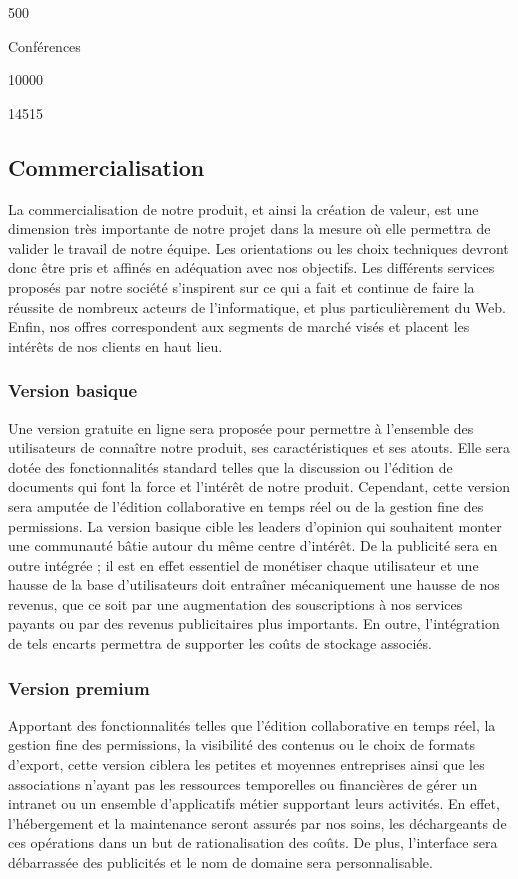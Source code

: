 \documentclass[10pt,twocolumn,a4paper,utf8x]{article}
\begin{document}
500

Conférences

10000

14515

\subsection{Commercialisation}

La commercialisation de notre produit, et ainsi la création de valeur,
est une dimension très importante de notre projet dans la mesure où elle
permettra de valider le travail de notre équipe. Les orientations ou les
choix techniques devront donc être pris et affinés en adéquation avec
nos objectifs. Les différents services proposés par notre société
s'inspirent sur ce qui a fait et continue de faire la réussite de
nombreux acteurs de l'informatique, et plus particulièrement du Web.
Enfin, nos offres correspondent aux segments de marché visés et placent
les intérêts de nos clients en haut lieu.

\subsubsection{Version basique}

Une version gratuite en ligne sera proposée pour permettre à l'ensemble
des utilisateurs de connaître notre produit, ses caractéristiques et ses
atouts. Elle sera dotée des fonctionnalités standard telles que la
discussion ou l'édition de documents qui font la force et l'intérêt de
notre produit. Cependant, cette version sera amputée de l'édition
collaborative en temps réel ou de la gestion fine des permissions. La
version basique cible les leaders d'opinion qui souhaitent monter une
communauté bâtie autour du même centre d'intérêt. De la publicité sera
en outre intégrée ; il est en effet essentiel de monétiser chaque
utilisateur et une hausse de la base d'utilisateurs doit entraîner
mécaniquement une hausse de nos revenus, que ce soit par une
augmentation des souscriptions à nos services payants ou par des revenus
publicitaires plus importants. En outre, l'intégration de tels encarts
permettra de supporter les coûts de stockage associés.

\subsubsection{Version premium}

Apportant des fonctionnalités telles que l'édition collaborative en
temps réel, la gestion fine des permissions, la visibilité des contenus
ou le choix de formats d'export, cette version ciblera les petites et
moyennes entreprises ainsi que les associations n'ayant pas les
ressources temporelles ou financières de gérer un intranet ou un
ensemble d'applicatifs métier supportant leurs activités. En effet,
l'hébergement et la maintenance seront assurés par nos soins, les
déchargeants de ces opérations dans un but de rationalisation des coûts.
De plus, l'interface sera débarrassée des publicités et le nom de
domaine sera personnalisable.
\end{document}
